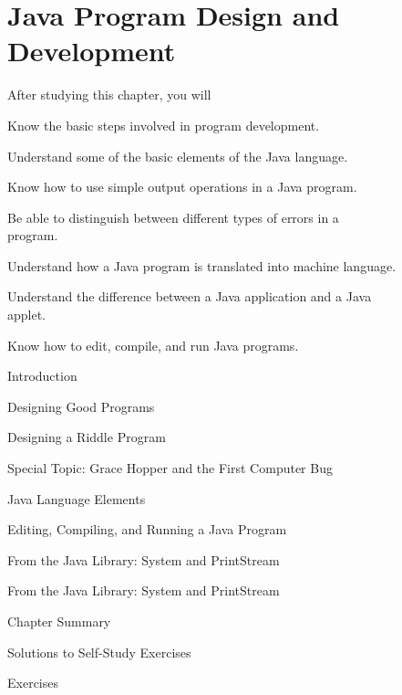 

\setcounter{chapter}{0}
\setcounter{SSTUDYcount}{1}
\chapter{Java Program Design and Development}
\label{chapter-intro2}
\label{pg-chapter-intro2}

\CObegin
{}
\noindent After studying this chapter, you will

\begin{COBL}
\item  Know the basic steps involved in program
       development.
\item  Understand some of the basic elements of the Java language.
\item  Know how to use simple output operations in
       a Java program.
\item  Be able to distinguish between different types of errors in
       a \\program.
\item  Understand how a Java program is translated into
       machine language.
\item  Understand the difference between a Java application
       and a Java \\applet.
\item  Know how to edit, compile, and run Java programs.
\end{COBL}


\begin{COL}
\item Introduction
\item Designing Good Programs
\item Designing a Riddle Program
\item[] {{\color{cyan}Special Topic:} Grace Hopper and the First Computer Bug}
\item Java Language Elements
\item Editing, Compiling, and Running a Java Program
\item From the Java Library: System and PrintStream
\item From the Java Library: {System} and {PrintStream}
\par\small\item[] Chapter Summary
\par\small\item[] Solutions to Self-Study Exercises
\par\small\item[] Exercises
\end{COL}
\COend

